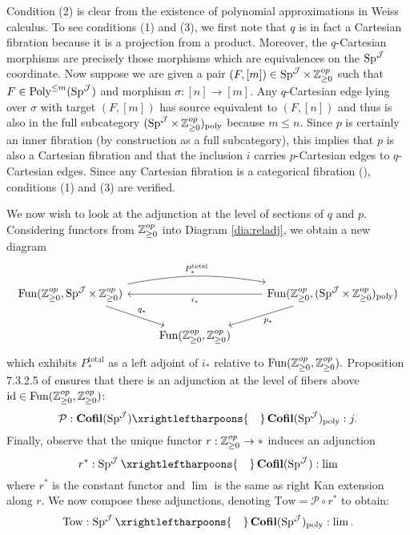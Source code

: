 \begin{cnstr}
Condition (2) is clear from the existence of polynomial approximations in Weiss calculus.  To see conditions (1) and (3), we first note that $q$ is in fact a Cartesian fibration because it is a projection from a product.  Moreover, the $q$-Cartesian morphisms are precisely those morphisms which are equivalences on the $\operatorname{\mathrm{Sp}}^{\operatorname{\mathcal{J}}}$ coordinate.  
Now suppose we are given a pair $(F, [m]) \in \operatorname{\mathrm{Sp}}^{\operatorname{\mathcal{J}}}\times \operatorname{\mathbb{Z}}^{op}_{\geq 0}$ such that $F\in \operatorname{\text{Poly}}^{\leq m}(\operatorname{\mathrm{Sp}}^{\operatorname{\mathcal{J}}})$ and morphism $\sigma :[n]\to [m]$.  Any $q$-Cartesian edge lying over $\sigma$ with target $(F, [m])$ has source equivalent to $(F, [n])$ and thus is also in the full subcategory $(\operatorname{\mathrm{Sp}}^{\operatorname{\mathcal{J}}}\times \operatorname{\mathbb{Z}}^{op}_{\geq 0})_{\text{poly}}$ because $m\leq n$.   
Since $p$ is certainly an inner fibration (by construction as a full subcategory), this implies that $p$ is also a Cartesian fibration and that the inclusion $i$ carries $p$-Cartesian edges to $q$-Cartesian edges.  Since any Cartesian fibration is a categorical fibration (\cite[Proposition 3.3.1.7]{HTT}), conditions (1) and (3) are verified.  

We now wish to look at the adjunction at the level of sections of $q$ and $p$.  Considering functors from $\operatorname{\mathbb{Z}}_{\geq 0}^{op}$ into Diagram \ref{dia:reladj}, we obtain a new diagram 
$$
\begin{tikzcd}
\Fun(\Z^{op}_{\geq 0},\Sp^{\J}\times \Z^{op}_{\geq 0}) \arrow[rr, bend left=10,"P^{\text{total}}_*"] \arrow[rd,"q_*"]& &\Fun(\Z^{op}_{\geq 0},(\Sp^{\J}\times \Z^{op}_{\geq 0})_{\text{poly}}) \arrow[ld,"p_*"]\arrow[ll,"i_*"]  \\
& \Fun(\Z^{op}_{\geq 0}, \Z^{op}_{\geq 0})
\end{tikzcd}
$$
which exhibits $P^{\text{total}}_*$ as a left adjoint of $i_*$ relative to $\operatorname{\text{Fun}}(\operatorname{\mathbb{Z}}_{\geq 0}^{op},\operatorname{\mathbb{Z}}_{\geq 0}^{op}).$  Proposition 7.3.2.5 of \cite{HA} ensures that there is an adjunction at the level of fibers above $\text{id}\in \operatorname{\text{Fun}}(\operatorname{\mathbb{Z}}_{\geq 0}^{op},\operatorname{\mathbb{Z}}_{\geq 0}^{op})$: $$\mathcal{P}: \Cofil(\Sp^{\J}) \xrightleftharpoons{\quad} \Cofil(\Sp^{\J})_{\text{poly}}:j .$$  
Finally, observe that the unique functor $r: \operatorname{\mathbb{Z}}^{op}_{\geq 0} \to *$ induces an adjunction $$r^*: \Sp^{\J} \xrightleftharpoons{\quad} \Cofil(\Sp^{\J}): \lim$$ where $r^*$ is the constant functor and $\lim$ is the same as right Kan extension along $r$.  We now compose these adjunctions, denoting $\mathrm{Tow} = \mathcal{P}\circ r^*$ to obtain: $$\mathrm{Tow}: \Sp^{\J} \xrightleftharpoons{\quad}  \Cofil(\Sp^{\J})_{\text{poly}}: \lim.$$


\end{cnstr}
